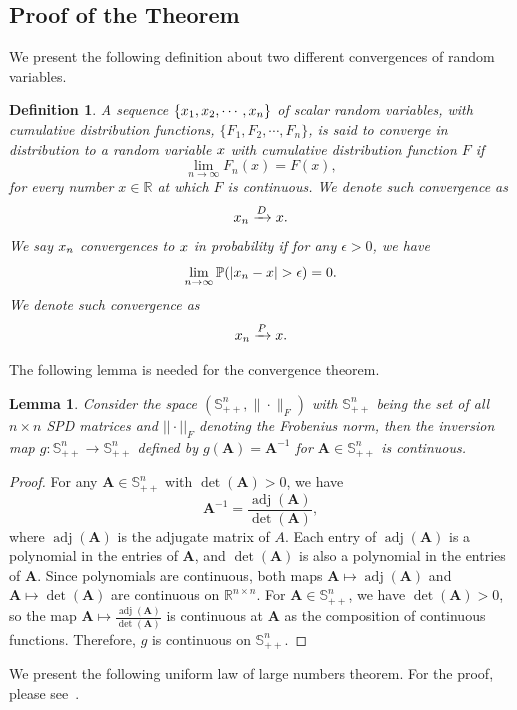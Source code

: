 \documentclass[11pt]{article} %
\def\rx{{\textnormal{x}}}
\def\mA{{\bm{A}}}
\newcommand{\R}{\mathbb{R}}
\newcommand{\norm}[1]{||#1||}
\newtheorem{lemma}{Lemma}
\newtheorem{definition}{Definition}
\begin{document}
\subsection{Proof of the Theorem}\label{append:proof}
%
We present the following definition about two different convergences of random variables.
\begin{definition}
A sequence $\{\rx_1, \rx_2, \cdots, \rx_n\}$ of scalar random variables, with cumulative distribution functions, $\{F_1, F_2, \cdots, F_n\}$, is said to converge in distribution to a random variable $\rx$ with cumulative distribution function $F$ if
\[
\lim_{n \rightarrow \infty} F_n(x) = F(x),
\]
for every number $x \in \R$ at which $F$ is continuous.  We denote such convergence as
\[
\rx_n \xrightarrow{D} \rx.
\]
We say $\rx_n$ convergences to $\rx$ in probability if for any $\epsilon > 0$, we have
\[
\lim_{n \rightarrow \infty} \mathbb{P}(|\rx_n - \rx| > \epsilon) = 0.
\]
We denote such convergence as
\[
\rx_n \xrightarrow{P} \rx.
\]
\end{definition}
The following lemma is needed for the convergence theorem.
\begin{lemma} \label{lemma:cont_inv}
Consider the space $(\mathbb{S}_{++}^n, \|\cdot\|_F)$ with $\mathbb{S}_{++}^n$ being the set of all $n \times n$ SPD matrices and $\norm{\cdot}_F$ denoting the Frobenius norm, then the inversion map $g: \mathbb{S}_{++}^n \to \mathbb{S}_{++}^n$ defined by $g(\mA) = \mA^{-1}$ for $\mA \in \mathbb{S}_{++}^n$ is continuous.
\end{lemma}
\begin{proof}
For any $\mA \in \mathbb{S}_{++}^n$ with $\det(\mA) > 0$, we have
\[
\mA^{-1} = \frac{\operatorname{adj}(\mA)}{\det(\mA)},
\]
where $\operatorname{adj}(\mA)$ is the adjugate matrix of $A$.  Each entry of $\operatorname{adj}(\mA)$ is a polynomial in the entries of $\mA$, and $\det(\mA)$ is also a polynomial in the entries of $\mA$. Since polynomials are continuous, both maps $\mA \mapsto \operatorname{adj}(\mA)$ and $\mA \mapsto \det(\mA)$ are continuous on $\R^{n \times n}$.  For $\mA \in \mathbb{S}_{++}^n$, we have $\det(\mA) > 0$, so the map $\mA \mapsto \frac{\operatorname{adj}(\mA)}{\det(\mA)}$ is continuous at $\mA$ as the composition of continuous functions.  Therefore, $g$ is continuous on $\mathbb{S}_{++}^n$.
\end{proof}
We present the following uniform law of large numbers theorem.  For the proof, please see~\citep{NEWEY19942111}.
\end{document}
